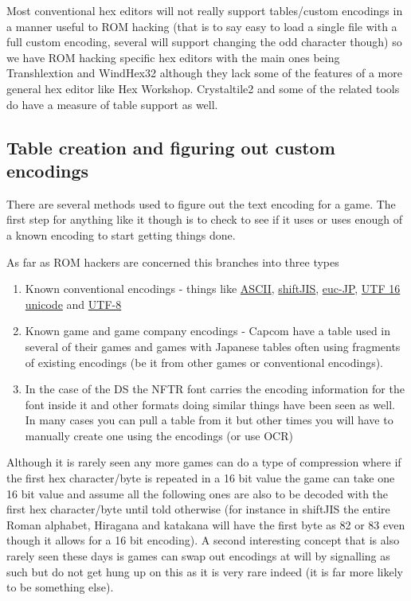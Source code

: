 \documentclass[
]{book}
\providecommand{\tightlist}{%
  \setlength{\itemsep}{0pt}\setlength{\parskip}{0pt}}
\begin{document}
Most conventional hex editors will not really support tables/custom encodings in a manner useful to ROM hacking (that is to say easy to load a single file with a full custom encoding, several will support changing the odd character though) so we have ROM hacking specific hex editors with the main ones being Transhlextion and WindHex32 although they lack some of the features of a more general hex editor like Hex Workshop. Crystaltile2 and some of the related tools do have a measure of table support as well.

\hypertarget{table-creation-and-figuring-out-custom-encodings}{%
\subsection{Table creation and figuring out custom encodings}\label{table-creation-and-figuring-out-custom-encodings}}

There are several methods used to figure out the text encoding for a game. The first step for anything like it though is to check to see if it uses or uses enough of a known encoding to start getting things done.

As far as ROM hackers are concerned this branches into three types

\begin{enumerate}
\def\labelenumi{\arabic{enumi}.}
\tightlist
\item
  Known conventional encodings - things like \href{http://www.asciitable.com/}{ASCII}, \href{http://www.rikai.com/library/kanjitables/kanji_codes.sjis.shtml}{shiftJIS}, \href{http://www.rikai.com/library/kanjitables/kanji_codes.euc.shtml}{euc-JP}, \href{http://unicode.org/charts/}{UTF 16 unicode} and \href{http://www.utf8-chartable.de/}{UTF-8}
\item
  Known game and game company encodings - Capcom have a table used in several of their games and games with Japanese tables often using fragments of existing encodings (be it from other games or conventional encodings).
\item
  In the case of the DS the NFTR font carries the encoding information for the font inside it and other formats doing similar things have been seen as well. In many cases you can pull a table from it but other times you will have to manually create one using the encodings (or use OCR)
\end{enumerate}

Although it is rarely seen any more games can do a type of compression where if the first hex character/byte is repeated in a 16 bit value the game can take one 16 bit value and assume all the following ones are also to be decoded with the first hex character/byte until told otherwise (for instance in shiftJIS the entire Roman alphabet, Hiragana and katakana will have the first byte as 82 or 83 even though it allows for a 16 bit encoding). A second interesting concept that is also rarely seen these days is games can swap out encodings at will by signalling as such but do not get hung up on this as it is very rare indeed (it is far more likely to be something else).
\end{document}
